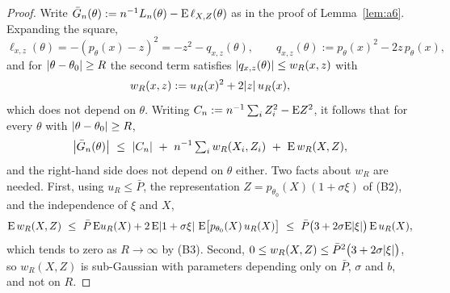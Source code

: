 \begin{proof}
Write $\bar G_n(\theta):=n^{-1}L_n(\theta)-\mathrm{E}\,\ell_{X,Z}(\theta)$ as in the proof of Lemma~\ref{lem:a6}. Expanding the square,
$$
\ell_{x,z}(\theta)=-(p_\theta(x)-z)^2=-z^2-q_{x,z}(\theta),\qquad q_{x,z}(\theta):=p_\theta(x)^2-2z\,p_\theta(x),
$$
and for $\lvert\theta-\theta_0\rvert\ge R$ the second term satisfies $\lvert q_{x,z}(\theta)\rvert\le w_R(x,z)$ with
\begin{equation}\label{eq:tail-envelope}
	w_R(x,z):=u_R(x)^2+2\lvert z\rvert\,u_R(x),
\end{equation}
which does not depend on $\theta$. Writing $C_n:=n^{-1}\sum_{i}Z_i^2-\mathrm{E} Z^2$, it follows that for every $\theta$ with $\lvert\theta-\theta_0\rvert\ge R$,
\begin{equation}\label{eq:tail-bound}
	\abs*{\bar G_n(\theta)}\ \le\ \abs{C_n}\ +\ n^{-1}\textstyle\sum_{i}w_R(X_i,Z_i)\ +\ \E\,w_R(X,Z),
\end{equation}
and the right-hand side does not depend on $\theta$ either. Two facts about $w_R$ are needed. First, using $u_R\le\bar P$, the representation $Z=p_{\theta_0}(X)(1+\sigma\xi)$ of (B2), and the independence of $\xi$ and $X$,
$$
\E\,w_R(X,Z)\ \le\ \bar P\,\E u_R(X)+2\,\E\abs{1+\sigma\xi}\ \E\big[p_{\theta_0}(X)\,u_R(X)\big]\ \le\ \bar P\big(3+2\sigma\E\abs{\xi}\big)\,\E\,u_R(X),
$$
which tends to zero as $R\to\infty$ by (B3). Second, $0\le w_R(X,Z)\le\bar P^2\big(3+2\sigma\lvert\xi\rvert\big)$, so $w_R(X,Z)$ is sub-Gaussian with parameters depending only on $\bar P$, $\sigma$ and $b$, and not on $R$.


\end{proof}
